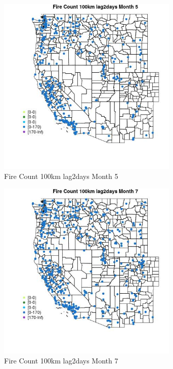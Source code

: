 \begin{figure} 
\centering  
\includegraphics[width=0.77\textwidth]{Code_Outputs/Report_ML_input_PM25_Step4_part_e_de_duplicated_aves_compiled_2019-05-18wNAs_MapObsMo5Fire_Count_100km_lag2days.jpg} 
\caption{\label{fig:Report_ML_input_PM25_Step4_part_e_de_duplicated_aves_compiled_2019-05-18wNAsMapObsMo5Fire_Count_100km_lag2days}Fire Count 100km lag2days Month 5} 
\end{figure} 
 

\begin{figure} 
\centering  
\includegraphics[width=0.77\textwidth]{Code_Outputs/Report_ML_input_PM25_Step4_part_e_de_duplicated_aves_compiled_2019-05-18wNAs_MapObsMo7Fire_Count_100km_lag2days.jpg} 
\caption{\label{fig:Report_ML_input_PM25_Step4_part_e_de_duplicated_aves_compiled_2019-05-18wNAsMapObsMo7Fire_Count_100km_lag2days}Fire Count 100km lag2days Month 7} 
\end{figure} 
 

